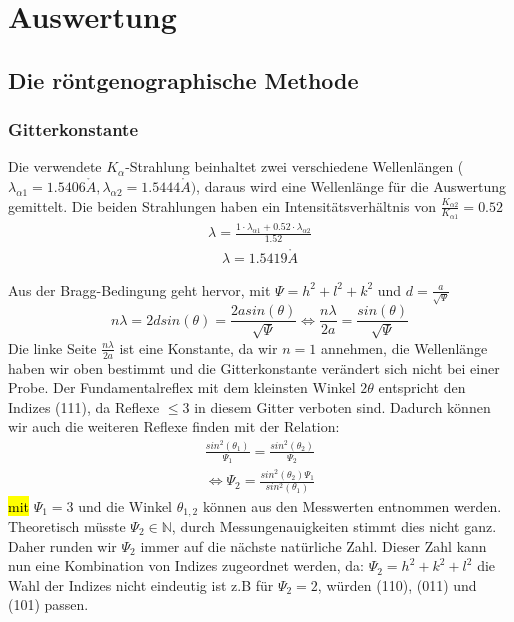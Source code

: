 \section{Auswertung}
    \subsection{Die röntgenographische Methode}
        \subsubsection{Gitterkonstante}
            Die verwendete $K_{\alpha}$-Strahlung beinhaltet zwei verschiedene Wellenlängen ($\lambda_{\alpha 1} = 1.5406 \mathring{A}, \lambda_{\alpha 2} = 1.5444 \mathring{A})$,
            daraus wird eine Wellenlänge
            für die Auswertung gemittelt. Die beiden Strahlungen haben ein Intensitätsverhältnis von $\frac{K_{\alpha 2}}{K_{\alpha 1}} = 0.52$
            \begin{align}
                \lambda = \frac{1 \cdot \lambda_{\alpha 1} + 0.52 \cdot \lambda_{\alpha 2}}{1.52}
            \end{align}
            \begin{align*}
                \lambda = 1.5419 \mathring{A}
            \end{align*}

            Aus der Bragg-Bedingung geht hervor, mit $\Psi =  h^2 + l^2 + k^2$ und $d = \frac{a}{\sqrt{\Psi}}$
            \begin{equation}
                n \lambda = 2dsin(\theta) = \frac{2asin(\theta)}{\sqrt{\Psi}} \Leftrightarrow \frac{n \lambda}{2a} = \frac{sin(\theta)}{\sqrt{\Psi}}
            \end{equation}
            Die linke Seite $\frac{n \lambda}{2a}$ ist eine Konstante, da wir $n=1$ annehmen, die Wellenlänge haben wir oben 
            bestimmt und die Gitterkonstante verändert sich nicht bei einer Probe. Der Fundamentalreflex mit dem kleinsten Winkel
            $2\theta$ entspricht den Indizes (111), da Reflexe $\leq 3$ in diesem Gitter
            verboten sind. Dadurch können wir auch die 
            weiteren Reflexe finden mit der Relation:
            \begin{align}
                \frac{sin^2(\theta_1)}{\Psi_1} = \frac{sin^2(\theta_2)}{\Psi_2} \\
                \Leftrightarrow \Psi_2 = \frac{sin^2(\theta_2)\Psi_1}{sin^2(\theta_1)}
            \end{align}
            \hl{mit} $\Psi_1 = 3$ und die Winkel $\theta_{1,2}$ können aus den Messwerten entnommen werden. Theoretisch
            müsste $\Psi_2 \in \mathbb{N}$, durch Messungenauigkeiten stimmt dies nicht ganz. Daher runden wir $\Psi_2$ immer auf die 
            nächste natürliche Zahl. Dieser Zahl kann nun eine Kombination von Indizes zugeordnet werden, da:
            $\Psi_2 = h^2+k^2+l^2$ die Wahl der Indizes nicht eindeutig ist z.B für $\Psi_2 = 2$, würden (110), (011) und (101) passen.
            
